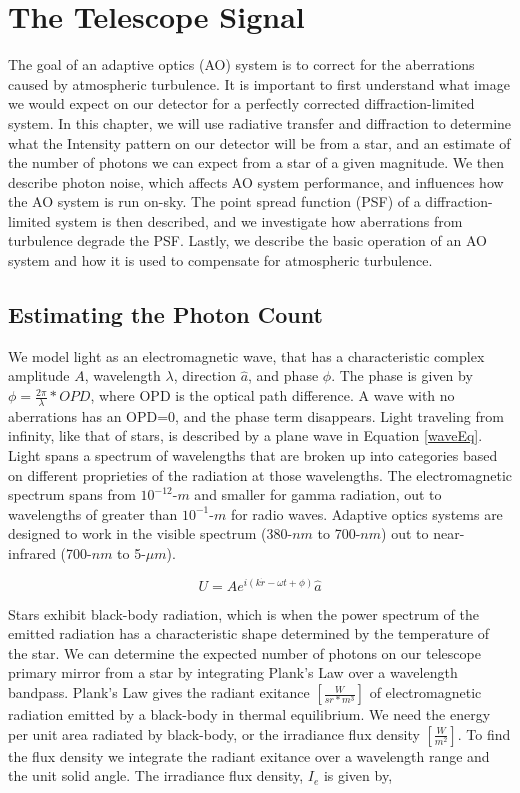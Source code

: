 \chapter{The Telescope Signal}\label{CH1}

 The goal of an adaptive optics (AO) system is to correct for the aberrations caused by atmospheric turbulence. It is important to first understand what image we would expect on our detector for a perfectly corrected diffraction-limited system. In this chapter, we will use radiative transfer and diffraction to determine what the Intensity pattern on our detector will be from a star, and an estimate of the number of photons we can expect from a star of a given magnitude. We then describe photon noise, which affects AO system performance, and influences how the AO system is run on-sky. The point spread function (PSF) of a diffraction-limited system is then described, and we investigate how aberrations from turbulence degrade the PSF. Lastly, we describe the basic operation of an AO system and how it is used to compensate for atmospheric turbulence.

\section{Estimating the Photon Count}\label{phcount}

We model light as an electromagnetic wave, that has a characteristic complex amplitude $A$, wavelength $\lambda$, direction $\hat{a}$, and phase $\phi$. The phase is given by $\phi= \frac{2\pi}{\lambda}*OPD$, where OPD is the optical path difference. A wave with no aberrations has an OPD=0, and the phase term disappears. Light traveling from infinity, like that of stars, is described by a plane wave in Equation \ref{waveEq}. Light spans a spectrum of wavelengths that are broken up into categories based on different proprieties of the radiation at those wavelengths. The electromagnetic spectrum spans from $10^{-12}$-$m$ and smaller for gamma radiation, out to wavelengths of greater than $10^{-1}$-$m$ for radio waves. Adaptive optics systems are designed to work in the visible spectrum (380-$nm$ to 700-$nm$) out to near-infrared (700-$nm$ to 5-$\mu m$).

\begin{equation}
    U=Ae^{i(k\dot r-\omega t+ \phi)}\hat{a}
    \label{waveEq}
\end{equation}

Stars exhibit black-body radiation, which is when the power spectrum of the emitted radiation has a characteristic shape determined by the temperature of the star. We can determine the expected number of photons on our telescope primary mirror from a star by integrating Plank's Law over a wavelength bandpass. Plank's Law gives the radiant exitance $[\frac{W}{sr*m^3}]$ of electromagnetic radiation emitted by a black-body in thermal equilibrium. We need the energy per unit area radiated by black-body, or the irradiance flux density $[\frac{W}{m^2}]$. To find the flux density we integrate the radiant exitance over a wavelength range and the unit solid angle. The irradiance flux density, $I_e$ is given by,

